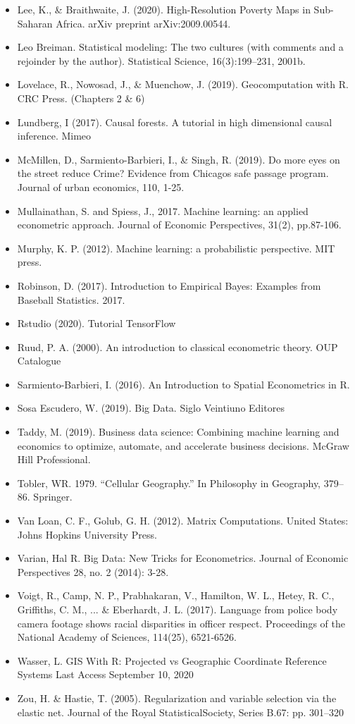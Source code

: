 \documentclass[11pt]{article}
\begin{document}
\begin{itemize}
\item Lee, K., \& Braithwaite, J. (2020). High-Resolution Poverty Maps in Sub-Saharan Africa. arXiv preprint arXiv:2009.00544.
\item Leo Breiman. Statistical modeling: The two cultures (with comments and a rejoinder by the author). Statistical Science, 16(3):199–231, 2001b.
\item Lovelace, R., Nowosad, J., \& Muenchow, J. (2019). Geocomputation with R. CRC Press. (Chapters 2 \& 6)
\item Lundberg, I (2017). Causal forests. A tutorial in high dimensional causal inference. Mimeo
\item McMillen, D., Sarmiento-Barbieri, I., \& Singh, R. (2019). Do more eyes on the street reduce Crime? Evidence from Chicagos safe passage program. Journal of urban economics, 110, 1-25.
\item Mullainathan, S. and Spiess, J., 2017. Machine learning: an applied econometric approach. Journal of Economic Perspectives, 31(2), pp.87-106.
\item Murphy, K. P. (2012). Machine learning: a probabilistic perspective. MIT press.
\item Robinson, D. (2017). Introduction to Empirical Bayes: Examples from Baseball Statistics. 2017.
\item Rstudio (2020). Tutorial TensorFlow
\item Ruud, P. A. (2000). An introduction to classical econometric theory. OUP Catalogue
\item Sarmiento-Barbieri, I. (2016). An Introduction to Spatial Econometrics in R.
\item Sosa Escudero, W. (2019). Big Data. Siglo Veintiuno Editores
\item Taddy, M. (2019). Business data science: Combining machine learning and economics to optimize, automate, and accelerate business decisions. McGraw Hill Professional.
\item Tobler, WR. 1979. “Cellular Geography.” In Philosophy in Geography, 379–86. Springer.
\item Van Loan, C. F., Golub, G. H. (2012). Matrix Computations. United States: Johns Hopkins University Press.
\item Varian, Hal R. Big Data: New Tricks for Econometrics. Journal of Economic Perspectives 28, no. 2 (2014): 3-28.
\item Voigt, R., Camp, N. P., Prabhakaran, V., Hamilton, W. L., Hetey, R. C., Griffiths, C. M., ... \& Eberhardt, J. L. (2017). Language from police body camera footage shows racial disparities in officer respect. Proceedings of the National Academy of Sciences, 114(25), 6521-6526.
\item Wasser, L. GIS With R: Projected vs Geographic Coordinate Reference Systems Last Access September 10, 2020
\item Zou, H. \& Hastie, T. (2005). Regularization and variable selection via the elastic net. Journal of the Royal StatisticalSociety, Series B.67: pp. 301–320


\end{itemize}
\end{document}
